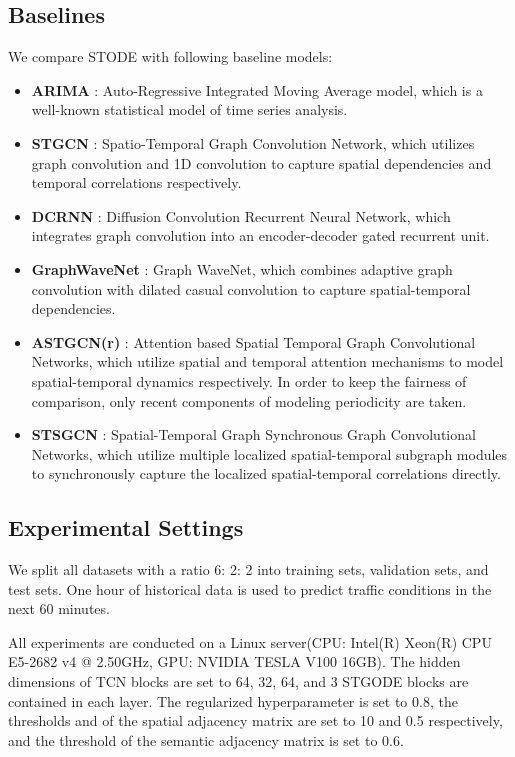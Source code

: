 \documentclass[sigconf]{acmart}
\theoremstyle{definition}
\begin{document}
\subsection{Baselines}
We compare STODE with following baseline models:
\begin{itemize}
  \item \textbf{ARIMA} \cite{box1970distribution}: Auto-Regressive Integrated Moving Average model, which is a well-known statistical model of time series analysis.
  \item \textbf{STGCN} \cite{yu2018spatio}: Spatio-Temporal Graph Convolution Network, which utilizes graph convolution and 1D convolution to capture spatial dependencies and temporal correlations respectively.
  \item \textbf{DCRNN} \cite{li2018diffusion}: Diffusion Convolution Recurrent Neural Network, which integrates graph convolution into an encoder-decoder gated recurrent unit.
  \item \textbf{GraphWaveNet} \cite{wu2019graph}: Graph WaveNet, which combines adaptive graph convolution with dilated casual convolution to capture spatial-temporal dependencies.
  \item \textbf{ASTGCN(r)} \cite{guo2019attention}: Attention based Spatial Temporal Graph Convolutional Networks, which utilize spatial and temporal attention mechanisms to model spatial-temporal dynamics respectively. In order to keep the fairness of comparison, only recent components of modeling periodicity are taken.
  \item \textbf{STSGCN} \cite{song2020spatial}: Spatial-Temporal Graph Synchronous Graph Convolutional Networks, which utilize multiple localized spatial-temporal subgraph modules to synchronously capture the localized spatial-temporal correlations directly.
  \end{itemize}

\subsection{Experimental Settings}
We split all datasets with a ratio 6: 2: 2 into training sets, validation sets, and test sets. One hour of historical data is used to predict traffic conditions in the next 60 minutes.

All experiments are conducted on a Linux server(CPU: Intel(R) Xeon(R) CPU E5-2682 v4 @ 2.50GHz, GPU: NVIDIA TESLA V100 16GB). The hidden dimensions of TCN blocks are set to 64, 32, 64, and 3 STGODE blocks are contained in each layer. The regularized hyperparameter  is set to 0.8, the thresholds  and  of the spatial adjacency matrix are set to 10 and 0.5 respectively, and the threshold  of the semantic adjacency matrix is set to 0.6.
\end{document}
